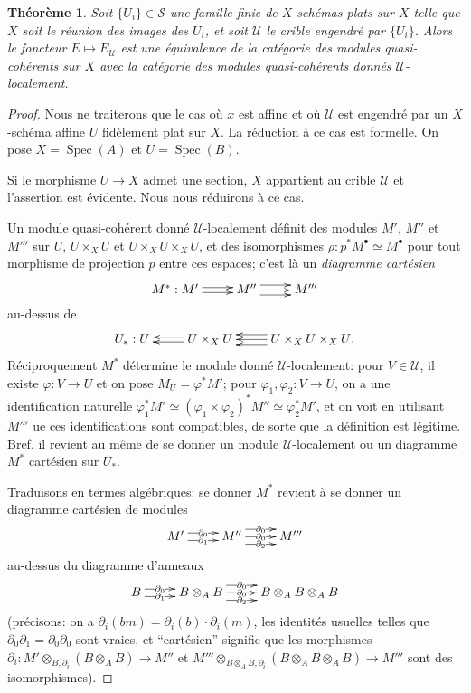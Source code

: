 \documentclass{article}
\DeclareMathOperator{\spec}{Spec}
\newcommand{\cS}{\mathcal{S}}
\newcommand{\cU}{\mathcal{U}}
\newtheorem{theorem}[subsubsection]{Théorème}
\begin{document}
\begin{theorem}\label{1-4-5}
Soit $\{U_i\}\in\cS$ une famille finie de $X$-schémas plats sur $X$ telle que 
$X$ soit le réunion des images des $U_i$, et soit $\cU$ le crible engendré par 
$\{U_i\}$. Alors le foncteur $E\mapsto E_\cU$ est une équivalence de la 
catégorie des modules quasi-cohérents sur $X$ avec la catégorie des modules 
quasi-cohérents donnés $\cU$-localement.
\end{theorem}
\begin{proof}
Nous ne traiterons que le cas où $x$ est affine et où $\cU$ est engendré par 
un $X$-schéma affine $U$ fidèlement plat sur $X$. La réduction à ce cas est 
formelle. On pose $X=\spec(A)$ et $U=\spec(B)$. 

Si le morphisme $U\to X$ admet une section, $X$ appartient au crible $\cU$ et 
l'assertion est évidente. Nous nous réduirons à ce cas. 

Un module quasi-cohérent donné $\cU$-localement définit des modules $M'$, $M''$ 
et $M'''$ sur $U$, $U\times_X U$ et $U\times_X U\times_X U$, et des 
isomorphismes $\rho:p^* M^\bullet\simeq M^\bullet$ pour tout morphisme de 
projection $p$ entre ces espaces; c'est là un \emph{diagramme cartésien} 
\[\xymatrix{
  M^* : M' \ar@<2pt>[r] \ar@<-2pt>[r] 
    & M'' \ar[r] \ar@<4pt>[r] \ar@<-4pt>[r] 
    & M'''
}\]
au-dessus de 
\[\xymatrix{
  U_* : U 
    & U\times_X U \ar@<2pt>[l] \ar@<-2pt>[l] 
    & U\times_X U\times_X U \ar[l] \ar@<4pt>[l] \ar@<-4pt>[l] \mbox{.}
}\]
Réciproquement $M^*$ détermine le module donné $\cU$-localement: pour 
$V\in\cU$, il existe $\varphi:V\to U$ et on pose $M_U=\varphi^* M'$; 
pour $\varphi_1,\varphi_2:V\to U$, on a une identification naturelle 
$\varphi_1^* M'\simeq (\varphi_1\times \varphi_2)^* M'' \simeq \varphi_2^* M'$, 
et on voit en utilisant $M'''$ ue ces identifications sont compatibles, de 
sorte que la définition est légitime. Bref, il revient au même de se donner un 
module $\cU$-localement ou un diagramme $M^*$ cartésien sur $U_*$. 

Traduisons en termes algébriques: se donner $M^*$ revient à se donner un 
diagramme cartésien de modules 
\[\xymatrix{
  M' \ar@<3pt>[r]|-{\partial_0} \ar@<-3pt>[r]|-{\partial_1} 
    & M'' \ar@<6pt>[r]|-{\partial_0} \ar[r]|-{\partial_0} \ar@<-6pt>[r]|-{\partial_2}
    & M'''
}\]
au-dessus du diagramme d'anneaux 
\[\xymatrix{
  B \ar@<3pt>[r]|-{\partial_0} \ar@<-3pt>[r]|-{\partial_1} 
    & B\otimes_A B \ar@<6pt>[r]|-{\partial_0} \ar[r]|-{\partial_0} \ar@<-6pt>[r]|-{\partial_2} 
    & B\otimes_A B\otimes_A B
}\]
(précisons: on a $\partial_i(b m)=\partial_i(b)\cdot\partial_i(m)$, les 
identités usuelles telles que $\partial_0\partial_1=\partial_0\partial_0$ 
sont vraies, et ``cartésien'' signifie que les morphismes 
$\partial_i:M'\otimes_{B,\partial_i}(B\otimes_A B)\to M''$ et 
$M'''\otimes_{B\otimes_A B,\partial_i}(B\otimes_A B\otimes_A B)\to M'''$ sont 
des isomorphismes). 


\end{proof}
\end{document}
